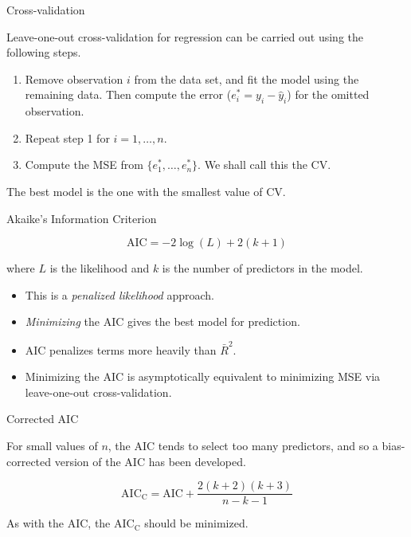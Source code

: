 \documentclass[14pt]{beamer}
\makeatletter
\def\biz{\begin{itemize}[<+-| alert@+>]}
\def\eiz{\end{itemize}}
\def\ben{\begin{enumerate}[<+-| alert@+>]}
\def\een{\end{enumerate}}
\makeatother
\begin{document}
\begin{frame}{Cross-validation}

Leave-one-out cross-validation for regression can be carried out using the following steps.
\ben
\item Remove observation $i$ from the data set, and fit the model using the remaining data. Then compute the error ($e_i^*=y_i-\hat{y}_i$) for the omitted observation.
\item Repeat step 1 for $i=1,\dots,n$.
\item Compute the MSE from $\{e_1^*,\dots,e_n^*\}$. We shall call this the CV.
\een\pause
The best model is the one with the smallest value of CV.
\end{frame}

\begin{frame}{Akaike's Information Criterion}

\begin{block}{}
\[
\text{AIC} = -2\log(L) + 2(k+1)
\]
\end{block}
where $L$ is the likelihood and $k$ is the number of predictors in the model.\pause

\biz
\item This is a \emph{penalized likelihood} approach.

\item \emph{Minimizing} the AIC gives the best model for prediction.

\item AIC penalizes terms more heavily than $\bar{R}^2$.

\item Minimizing the AIC is asymptotically equivalent to minimizing MSE via leave-one-out cross-validation.
\eiz

\end{frame}

\begin{frame}{Corrected AIC}

For small values of $n$, the AIC tends to select too many predictors, and so a bias-corrected version of the AIC has been developed.
\begin{block}{}
\[
\text{AIC}_{\text{C}} = \text{AIC} + \frac{2(k+2)(k+3)}{n-k-1}
\]
\end{block}
As with the AIC, the AIC$_{\text{C}}$ should be minimized.
\end{frame}
\end{document}
